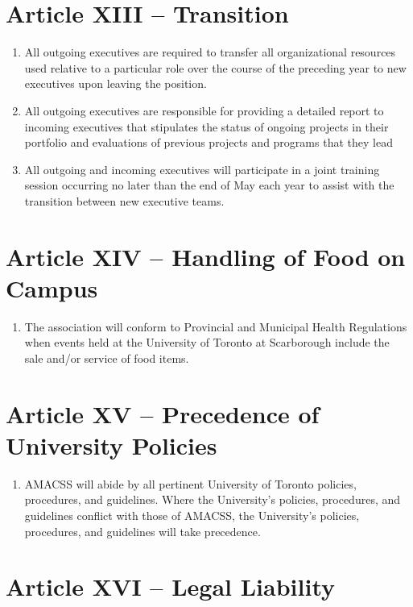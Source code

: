 \documentclass[12pt,a4paper]{article}
\begin{document}
\section*{Article XIII – Transition}

\begin{enumerate}
\item All outgoing executives are required to transfer all organizational resources used relative to a particular role over the course of the preceding year to new executives upon leaving the position.

\item All outgoing executives are responsible for providing a detailed report to incoming executives that stipulates the status of ongoing projects in their portfolio and evaluations of previous projects and programs that they lead

\item All outgoing and incoming executives will participate in a joint training session occurring no later than the end of May each year to assist with the transition between new executive teams.
\end{enumerate}

\section*{Article XIV – Handling of Food on Campus}

\begin{enumerate}
\item The association will conform to Provincial and Municipal Health Regulations when events held at the University of Toronto at Scarborough include the sale and/or service of food items.
\end{enumerate}

\section*{Article XV – Precedence of University Policies}

\begin{enumerate}
\item AMACSS will abide by all pertinent University of Toronto policies, procedures, and guidelines. Where the University's policies, procedures, and guidelines conflict with those of AMACSS, the University's policies, procedures, and guidelines will take precedence.
\end{enumerate}

\section*{Article XVI – Legal Liability}
\end{document}
